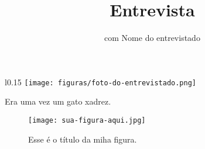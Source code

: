 %
% 
%
%
%
%

\title{Entrevista}
\subtitle{com Nome do entrevistado}
\maketitle

\begin{wrapfigure}{l}{0.15\textwidth}
\texttt{[image: figuras/foto-do-entrevistado.png]}
\end{wrapfigure}

Era uma vez um gato xadrez.



\vspace{5mm}
\begin{figure}[htbp]
   \centering
   \texttt{[image: sua-figura-aqui.jpg]}

   \caption{Esse é o título da miha figura.}

   \label{fig:rótulo-da-figura}
\end{figure}



